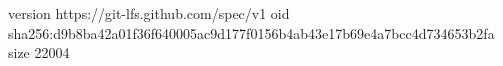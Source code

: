 version https://git-lfs.github.com/spec/v1
oid sha256:d9b8ba42a01f36f640005ac9d177f0156b4ab43e17b69e4a7bcc4d734653b2fa
size 22004
